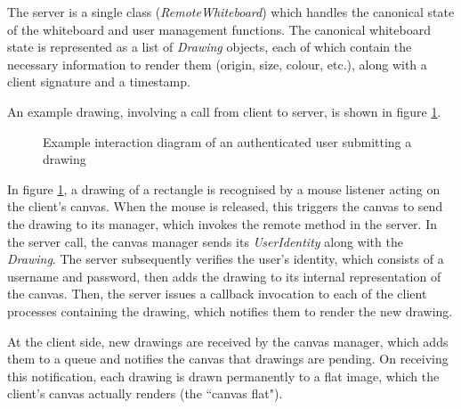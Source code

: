 \documentclass[12pt,a4paper]{article}
\begin{document}
The server is a single class (\textit{RemoteWhiteboard}) which handles the canonical state of the whiteboard and user management functions. The canonical whiteboard state is represented as a list of \textit{Drawing} objects, each of which contain the necessary information to render them (origin, size, colour, etc.), along with a client signature and a timestamp. 

An example drawing, involving a call from client to server, is shown in figure \ref{fig:draw}.

\begin{figure}[h]
\caption{Example interaction diagram of an authenticated user submitting a drawing}
\label{fig:draw}
\centering
\end{figure}

In figure \ref{fig:draw}, a drawing of a rectangle is recognised by a mouse listener acting on the client's canvas. When the mouse is released, this triggers the canvas to send the drawing to its manager, which invokes the remote method in the server. In the server call, the canvas manager sends its \textit{UserIdentity} along with the \textit{Drawing}. The server subsequently verifies the user's identity, which consists of a username and password, then adds the drawing to its internal representation of the canvas. Then, the server issues a callback invocation to each of the client processes containing the drawing, which notifies them to render the new drawing.

At the client side, new drawings are received by the canvas manager, which adds them to a queue and notifies the canvas that drawings are pending. On receiving this notification, each drawing is drawn permanently to a flat image, which the client's canvas actually renders (the ``canvas flat"). 
\end{document}
